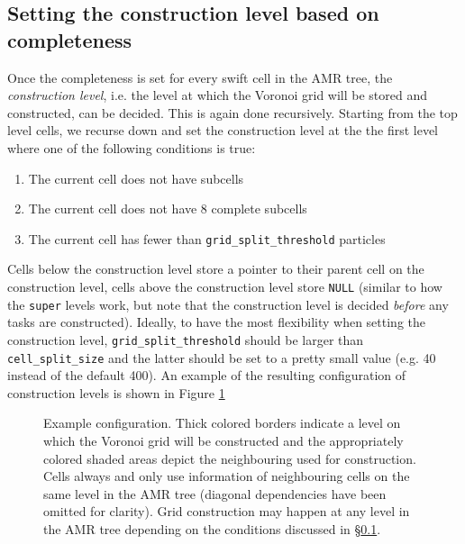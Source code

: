 \subsection{Setting the construction level based on completeness} \label{sec:construction-level}

Once the completeness is set for every swift cell in the AMR tree, the \emph{construction level}, i.e. the level at which the Voronoi grid will be stored and constructed, can be decided. This is again done recursively. Starting from the top level cells, we recurse down and set the construction level at the the first level where one of the following conditions is true:
\begin{enumerate}
    \item The current cell does not have subcells
    \item The current cell does not have 8 complete subcells
    \item The current cell has fewer than \texttt{grid\_split\_threshold} particles
\end{enumerate} 
Cells below the construction level store a pointer to their parent cell on the construction level, cells above the construction level store \texttt{NULL} (similar to how the \texttt{super} levels work, but note that the construction level is decided \emph{before} any tasks are constructed).
Ideally, to have the most flexibility when setting the construction level, \texttt{grid\_split\_threshold} should be larger than \texttt{cell\_split\_size} and the latter should be set to a pretty small value (e.g. 40 instead of the default 400). An example of the resulting configuration of construction levels is shown in Figure \ref{fig:construction-level}

\begin{figure}
    \centering
    
    \caption{Example configuration.  Thick colored borders indicate a level on which the Voronoi grid will be constructed and the appropriately colored shaded areas depict the neighbouring used for construction. Cells always and only use information of neighbouring cells on the same level in the AMR tree (diagonal dependencies have been omitted for clarity). Grid construction may happen at any level in the AMR tree depending on the conditions discussed in \S\ref{sec:construction-level}.}
    \label{fig:construction-level}
\end{figure}

